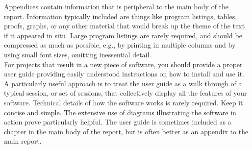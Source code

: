  Appendices contain information that is peripheral to the main body of the report. Information typically included are things like program listings, tables, proofs, graphs, or any other material that would break up the theme of the text if it appeared in situ. Large program listings are rarely required, and should be compressed as much as possible, e.g., by printing in multiple columns and by using small font sizes, omitting inessential detail.\\

 For projects that result in a new piece of software, you should provide a proper user guide providing easily understood instructions on how to install and use it. A particularly useful approach is to treat the user guide as a walk through of a typical session, or set of sessions, that collectively display all the features of your software. Technical details of how the software works is rarely required. Keep it concise and simple. The extensive use of diagrams illustrating the software in action prove particularly helpful. The user guide is sometimes included as a chapter in the main body of the report, but is often better as an appendix to the main report.\\